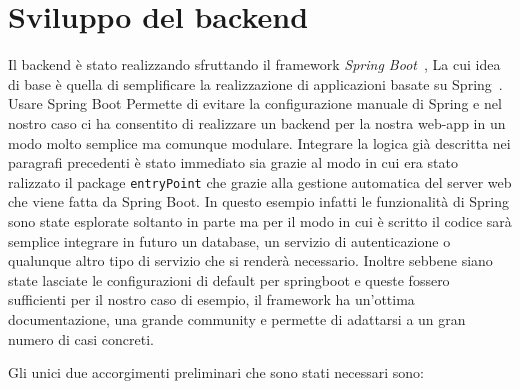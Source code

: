 \section{Sviluppo del backend}
Il backend è stato realizzando sfruttando il framework \emph{Spring Boot}~\cite{springboot}, La cui idea di base è quella di semplificare la realizzazione di applicazioni basate su Spring~\cite{spring}. Usare Spring Boot Permette di evitare la configurazione manuale di Spring e nel nostro caso ci ha consentito di realizzare un backend per la nostra web-app in un modo molto semplice ma comunque modulare. Integrare la logica già descritta nei paragrafi precedenti è stato immediato sia grazie al modo in cui era stato ralizzato il package \texttt{entryPoint} che grazie alla gestione automatica del server web che viene fatta da Spring Boot. In questo esempio infatti le funzionalità di Spring sono state esplorate soltanto in parte ma per il modo in cui è scritto il codice sarà semplice integrare in futuro un database, un servizio di autenticazione o qualunque altro tipo di servizio che si renderà necessario. Inoltre sebbene siano state lasciate le configurazioni di default per springboot e queste fossero sufficienti per il nostro caso di esempio, il framework ha un'ottima documentazione, una grande community e permette di adattarsi a un gran numero di casi concreti.\par
Gli unici due accorgimenti preliminari che sono stati necessari sono:
